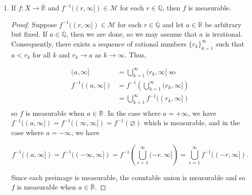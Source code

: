 \documentclass[11pt,oneside,english]{amsart}
\theoremstyle{definition}
\newcommand{\R}{\mathbb{R}}
\newcommand{\MC}[1]{\mathcal{#1}}
\begin{document}
\begin{enumerate}
\begin{proof}
\begin{align*}
\{x\mid \lim f_n(x)\text{ exists}\}&=\{x\mid \liminf f_n(x)=\limsup f_n(x)\}\\[2mm]
&=\{x \mid g_4(x)=g_3(x)\}\\[2mm]
&=\{ x\mid g_3(x)-g_4(x)=0\}\\[2mm]
&=(g_3-g_4)^{-1}(\{0\})\\[2mm]
&=(g_3-g_4)^{-1}\left(\bigcap_{k=1}^\infty\left(-\frac{1}{k},\frac{1}{k}\right)\right)\\[2mm]
&=\bigcap_{k=1}^\infty(g_3-g_4)^{-1}\left(\left(-\frac{1}{k},\frac{1}{k}\right)\right).
\end{align*}

Since $g_3,g_4$ are measurable, so is their difference, and the above equation shows that $\{x\mid \lim f_n(x)\text{ exists}\}$ is a countable intersection of measurable sets, and so it is measurable.
\end{proof}


\item If $f:X\rightarrow \overline{\R}$ and $f^{-1}((r,\infty])\in\MC{M}$ for each $r\in\mathbb{Q}$, then $f$ is measurable.

\begin{proof}
Suppose $f^{-1}((r,\infty])\in\MC{M}$ for each $r\in\mathbb{Q}$ and let $a\in \R$ be arbitrary but fixed. If $a\in\mathbb{Q}$, then we are done, so we may assume that $a$ is irrational. Consequently, there exists a sequence of rational numbers $\{r_k\}_{k=1}^\infty$ such that $a<r_k$ for all $k$ and $r_k\rightarrow a$ as $k\rightarrow\infty$. Thus,

\begin{align*}
(a,\infty]&=\bigcup_{k=1}^\infty(r_k,\infty]\text{ so}\\[2mm]
f^{-1}((a,\infty])&=f^{-1}\left(\bigcup_{k=1}^\infty(r_k,\infty]\right)\\[2mm]
&=\bigcup_{k=1}^\infty f^{-1}((r_k,\infty])\\[2mm]
\end{align*}
so $f$ is measurable when $a\in \R$. In the case where $a=+\infty$, we have $f^{-1}((a,\infty])=f^{-1}((\infty,\infty])=f^{-1}(\varnothing)$ which is measurable, and in the case where $a=-\infty$, we have 

\[
f^{-1}((a,\infty])=f^{-1}((-\infty,\infty])=f^{-1}\left(\bigcup_{r=1}^\infty(-r,\infty]\right)=\bigcup_{r=1}^\infty f^{-1}((-r,\infty]).
\]

Since each preimage is measurable, the countable union is measurable and so $f$ is measurable when $a\in\overline{\R}$.
\end{proof}


\end{enumerate}
\end{document}
